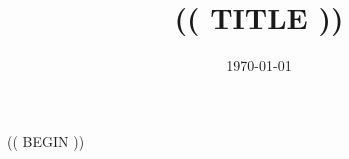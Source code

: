 \documentclass[12pt]{article}
\title{(( TITLE ))\hspace{-0.5cm}}
\author{\today}
\date{}
\begin{document}
\maketitle

(( BEGIN ))
	
\end{document}

